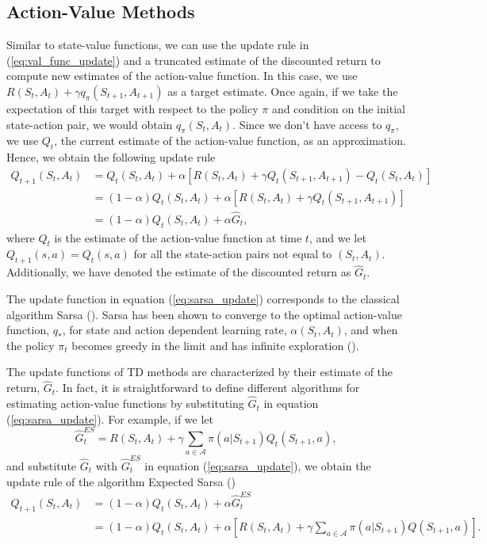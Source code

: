 \subsection{Action-Value Methods}
\label{subsec:av_methods}

Similar to state-value functions, we can use the update rule in (\ref{eq:val_func_update}) and a truncated estimate of the discounted return to compute new estimates of the action-value function.
In this case, we use $R(S_t,A_t) + \gamma q_\pi(S_{t+1}, A_{t+1})$ as a target estimate.
Once again, if we take the expectation of this target with respect to the policy $\pi$ and condition on the initial state-action pair, we would obtain $q_\pi(S_t,A_t)$.
Since we don't have access to $q_\pi$, we use $Q_t$, the current estimate of the action-value function, as an approximation.
Hence, we obtain the following update rule
\begin{align}
\label{eq:sarsa_update}
Q_{t+1}(S_t,A_t) & = Q_t(S_t,A_t) + \alpha [R(S_t, A_t) 
	+ \gamma Q_t(S_{t+1}, A_{t+1}) - Q_t(S_t, A_t)] \nonumber \\
%
& = (1-\alpha) Q_t(S_t, A_t) + \alpha [R(S_t, A_t) + \gamma Q_t(S_{t+1}, A_{t+1})] \nonumber \\
%
& = (1-\alpha) Q_t(S_t, A_t) + \alpha \hat{G}_{t},
\end{align}
where $Q_t$ is the estimate of the action-value function at time $t$, and we let $Q_{t+1}(s,a) = Q_t(s,a)$ for all the state-action pairs not equal to $(S_t,A_t)$.
Additionally, we have denoted  the estimate of the discounted return as $\hat{G}_t$.

The update function in equation (\ref{eq:sarsa_update}) corresponds to the classical algorithm Sarsa (\cite{rummery1995,sutton1996}).
Sarsa has been shown to converge to the optimal action-value function, $q_*$, for state and action dependent learning rate, $\alpha(S_t,A_t)$, and when the policy $\pi_t$ becomes greedy in the limit and has infinite exploration (\cite{Singh2000}).

The update functions of TD methods are characterized by their estimate of the return, $\hat{G}_t$.
In fact, it is straightforward to define different algorithms for estimating action-value functions by substituting $\hat{G}_t$ in equation (\ref{eq:sarsa_update}).
For example, if we let
\begin{equation}
\label{eq:expsarsa_return}
\hat{G}^{ES}_t = R(S_t, A_t) + \gamma \sum_{a \in \mathcal{A}} \pi(a|S_{t+1}) Q_t(S_{t+1},a),
\end{equation}
and substitute $\hat{G}_t$ with $\hat{G}^{ES}_t$ in equation (\ref{eq:sarsa_update}), we obtain the update rule of the algorithm Expected Sarsa (\cite{precup2000,harm-hado-expected-sarsa})
\begin{align}
\label{eq:expsarsa_update}
Q_{t+1}(S_t, A_t) &= (1-\alpha) Q_t(S_t,A_t) + \alpha \hat{G}^{ES}_t \nonumber \\
%
&= (1-\alpha) Q_t(S_t,A_t) + \alpha [R(S_t,A_t) 
	+ \gamma \sum_{a \in \mathcal{A}} \pi(a|S_{t+1}) Q(S_{t+1},a)]. %
%
\end{align}

